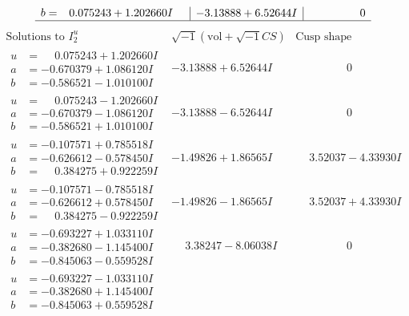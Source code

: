 \documentclass[1p]{elsarticle_modified}
\theoremstyle{definition}
\newcommand{\I}{\sqrt{-1}}
\begin{document}
$$\begin{array}{c|c|c}
\begin{aligned}
b &= \phantom{-}0.075243 + 1.202660 I\end{aligned}
 & -3.13888 + 6.52644 I & \phantom{-0.000000 } 0\\
 \hline 
 \end{array}$$\newpage$$\begin{array}{c|c|c}  
\text{Solutions to }I^u_{2}& \I (\text{vol} + \sqrt{-1}CS) & \text{Cusp shape}\\
 \hline 
\begin{aligned}
u &= \phantom{-}0.075243 + 1.202660 I \\
a &= -0.670379 + 1.086120 I \\
b &= -0.586521 - 1.010100 I\end{aligned}
 & -3.13888 + 6.52644 I & \phantom{-0.000000 } 0 \\ \hline\begin{aligned}
u &= \phantom{-}0.075243 - 1.202660 I \\
a &= -0.670379 - 1.086120 I \\
b &= -0.586521 + 1.010100 I\end{aligned}
 & -3.13888 - 6.52644 I & \phantom{-0.000000 } 0 \\ \hline\begin{aligned}
u &= -0.107571 + 0.785518 I \\
a &= -0.626612 - 0.578450 I \\
b &= \phantom{-}0.384275 + 0.922259 I\end{aligned}
 & -1.49826 + 1.86565 I & \phantom{-}3.52037 - 4.33930 I \\ \hline\begin{aligned}
u &= -0.107571 - 0.785518 I \\
a &= -0.626612 + 0.578450 I \\
b &= \phantom{-}0.384275 - 0.922259 I\end{aligned}
 & -1.49826 - 1.86565 I & \phantom{-}3.52037 + 4.33930 I \\ \hline\begin{aligned}
u &= -0.693227 + 1.033110 I \\
a &= -0.382680 - 1.145400 I \\
b &= -0.845063 - 0.559528 I\end{aligned}
 & \phantom{-}3.38247 - 8.06038 I & \phantom{-0.000000 } 0 \\ \hline\begin{aligned}
u &= -0.693227 - 1.033110 I \\
a &= -0.382680 + 1.145400 I \\
b &= -0.845063 + 0.559528 I\end{aligned}

\end{array}$$
\end{document}
